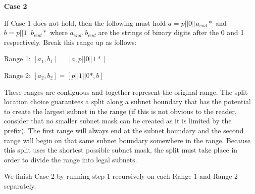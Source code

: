 \documentclass[pdf,bookmarks,colorlinks=true]{article}
\theoremstyle{definition}
\begin{document}
\textbf{Case 2}

If Case 1 does not hold, then the following must hold $a = p||0||a_{end}*$ and $b = p||1||b_{end}*$ where $a_{end}, b_{end}$ are the strings of binary digits after the 0 and 1 respectively. Break this range up as follows:

Range 1: $[a_1, b_1] = [a, p||0||1*]$

Range 2: $[a_2, b_2] = [p||1||0*, b]$  

These ranges are contiguous and together represent the original range. The split location choice guarantees a split along a subnet boundary that has the potential to create the largest subnet in the range (if this is not obvious to the reader, consider that no smaller subnet mask can be created as it is limited by the prefix). The first range will always end at the  subnet boundary and the second range will begin on that same subnet boundary somewhere in the range. Because this split uses the shortest possible subnet mask, the split must take place in order to divide the range into legal subnets.

We finish Case 2 by running step 1 recursively on each Range 1 and Range 2 separately.
\end{document}

